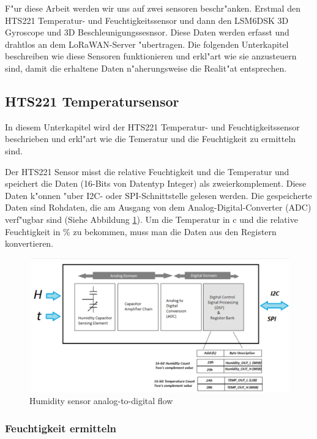 F"ur diese Arbeit werden wir uns auf zwei sensoren beschr"anken. Erstmal den HTS221 Temperatur- und Feuchtigkeitssensor und dann den LSM6DSK 3D Gyroscope und 3D Beschleunigungssesnsor. Diese Daten werden erfasst und drahtlos an dem LoRaWAN-Server "ubertragen. Die folgenden Unterkapitel beschreiben wie diese Sensoren funktionieren und erkl"art wie sie anzusteuern sind, damit die erhaltene Daten n"aherungsweise die Realit"at entsprechen.  

\subsection {HTS221 Temperatursensor}\label{Temp}
In diesem Unterkapitel wird der HTS221 Temperatur- und Feuchtigkeitssensor beschrieben und erkl"art wie die Temeratur und die Feuchtigkeit zu ermitteln sind.

Der HTS221 Sensor misst die relative Feuchtigkeit und die Temperatur und speichert die Daten (16-Bits von Datentyp Integer) als zweierkomplement. Diese Daten k"onnen "uber I2C- oder SPI-Schnittstelle gelesen werden. Die gespeicherte Daten sind Rohdaten, die am Ausgang von dem Analog-Digital-Converter (ADC) verf"ugbar sind (Siehe Abbildung \ref{HT_sensor}). Um die Temperatur in \textdegree{}c und die relative Feuchtigkeit in \% zu bekommen, muss man die Daten aus den Registern konvertieren.

\begin{figure}[h]
	\centering
	\includegraphics[width=14cm]{source/images/HTS221_sensor}
	\caption{Humidity sensor analog-to-digital flow \cite{HTS221}}\label{HT_sensor}
\end{figure}

\subsubsection{Feuchtigkeit ermitteln}

